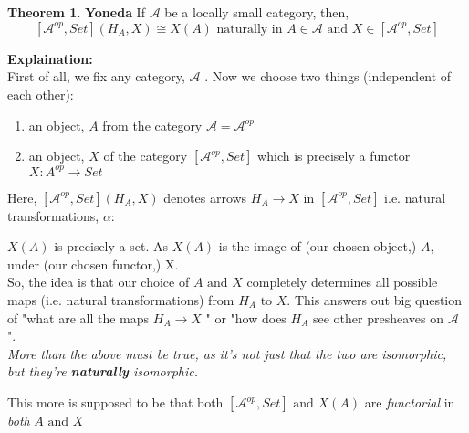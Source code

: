 \documentclass[18pt,a4paper]{extarticle}
\theoremstyle{definition}
\newtheorem{theorem}{Theorem}[section]
\theoremstyle{definition}
\begin{document}
\section{}
\begin{theorem}{\textbf{Yoneda}} %
	If $\mathcal{A} $ be a locally small category, then, \\
	\[ [ \mathcal{A} ^{op},Set ](H_A,X) \cong X(A) \text{ naturally in } A \in \mathcal{A} \text{ and }
	X \in [ \mathcal{A}^{op},Set]\]
\end{theorem}
\textbf{Explaination:} \\
First of all, we fix any category, $\mathcal{A} $ . Now we choose two things (independent of each other):
\begin{enumerate}[label=\roman*]
	\item an object, $A$ from the category $ \mathcal{A}= \mathcal{A} ^{op} $
	\item an object, $X$ of the category $[ \mathcal{A}^{op},Set] $
		which is precisely a functor $X: A^{op} \rightarrow Set$
\end{enumerate}
Here, $[ \mathcal{A}^{op},Set](	H_A,X) $ denotes arrows $H_A \rightarrow X$ in $[ \mathcal{A}^{op},Set] $
i.e. natural transformations, $\alpha :$
$X(A)$ is precisely a set. As $X(A)$ is the image of (our chosen object,) $A$, under (our chosen functor,) X. \\

So, the idea is that our choice of $A \text{ and } X$ completely determines all possible maps
(i.e. natural transformations) from $H_A \text{ to } X$. This answers out big question of "what are all the maps
$H_A  \rightarrow X$ " or "how does $H_A$ see other presheaves on $\mathcal{A} $ ".\\

\textit{More than the above must be true, as it's not just that the two are isomorphic, but they're \textbf{naturally} isomorphic.}

This more is supposed to be that both $[ \mathcal{A}^{op},Set] \text{ and } X(A)$ are
\textit{functorial} in \textit{both} $A \text{ and } X$
\end{document}
